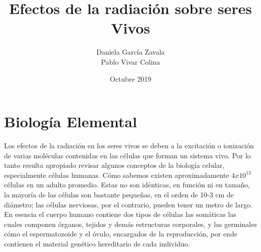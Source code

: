 \documentclass[]{article}
\title{Efectos de la radiación sobre seres Vivos}
\author{Daniela García Zavala\\ Pablo Vivar Colina}
\date{Octubre 2019}
\begin{document}
	

\maketitle

\tableofcontents  %

\listoffigures  %


\section{Biología Elemental}

Los efectos de la radiación en los seres vivos se deben a la excitación o ionización de varias moléculas contenidas en las células que forman un sistema vivo. Por lo tanto resulta apropiado revisar algunos conceptos de la biología celular, especialmente células humanas. Cómo sabemos existen aproximadamente $4 x 10^{13}$ células en un adulto promedio. Estas no son idénticas, en función ni en tamaño, la mayoría de las células son bastante pequeñas, en el orden de 10-3 cm de diámetro; las células nerviosas, por el contrario, pueden tener un metro de largo.\\

En esencia el cuerpo humano contiene dos tipos de células las somáticas las cuales componen órganos, tejidos y demás estructuras corporales, y las germinales cómo el espermatozoide y el óvulo, encargados de la reproducción, por ende contienen el material genético hereditario de cada individuo.\\





\end{document}
